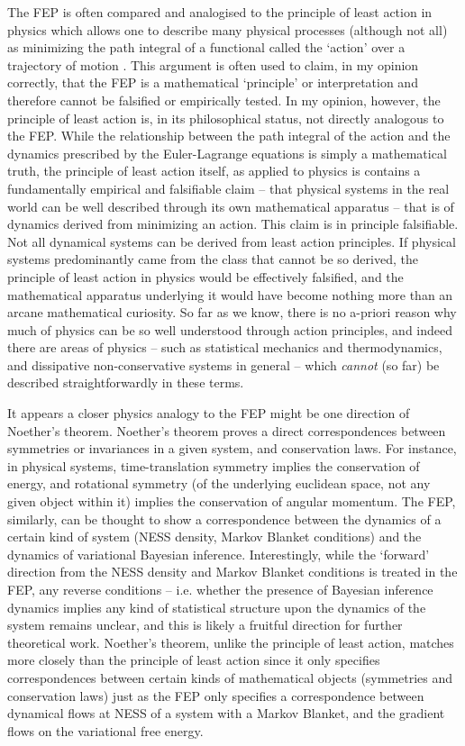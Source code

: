 The FEP is often compared and analogised to the principle of least action in physics \citep{lanczos2012variational} which allows one to describe many physical processes (although not all) as minimizing the path integral of a functional called the `action' over a trajectory of motion \citep{sussman2015structure}. This argument is often used to claim, in my opinion correctly, that the FEP is a mathematical `principle' or interpretation and therefore cannot be falsified or empirically tested. In my opinion, however, the principle of least action is, in its philosophical status, not directly analogous to the FEP. While the relationship between the path integral of the action and the dynamics prescribed by the Euler-Lagrange equations is simply a mathematical truth, the principle of least action itself, as applied to physics is contains a fundamentally empirical and falsifiable claim -- that physical systems in the real world can be well described through its own mathematical apparatus -- that is of dynamics derived from minimizing an action. This claim is in principle falsifiable. Not all dynamical systems can be derived from least action principles. If physical systems predominantly came from the class that cannot be so derived, the principle of least action in physics would be effectively falsified, and the mathematical apparatus underlying it would have become nothing more than an arcane mathematical curiosity. So far as we know, there is no a-priori reason why much of physics can be so well understood through action principles, and indeed there are areas of physics -- such as statistical mechanics and thermodynamics, and dissipative non-conservative systems in general -- which \emph{cannot} (so far) be described straightforwardly in these terms.

It appears a closer physics analogy to the FEP might be one direction of Noether's theorem. Noether's theorem proves a direct correspondences between symmetries or invariances in a given system, and conservation laws. For instance, in physical systems, time-translation symmetry implies the conservation of energy, and rotational symmetry (of the underlying euclidean space, not any given object within it) implies the conservation of angular momentum. The FEP, similarly, can be thought to show a correspondence between the dynamics of a certain kind of system (NESS density, Markov Blanket conditions) and the dynamics of variational Bayesian inference. Interestingly, while the `forward' direction from the NESS density and Markov Blanket conditions is treated in the FEP, any reverse conditions -- i.e. whether the presence of Bayesian inference dynamics implies any kind of statistical structure upon the dynamics of the system remains unclear, and this is likely a fruitful direction for further theoretical work. Noether's theorem, unlike the principle of least action, matches more closely than the principle of least action since it only specifies correspondences between certain kinds of mathematical objects (symmetries and conservation laws) just as the FEP only specifies a correspondence between dynamical flows at NESS of a system with a Markov Blanket, and the gradient flows on the variational free energy.

